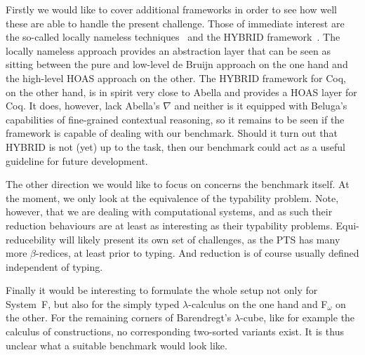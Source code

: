 \documentclass[a4paper,UKenglish]{lipics-v2016}
\begin{document}
Firstly we would like to cover additional frameworks in order to see how well these are able to handle the present challenge.
Those of immediate interest are the so-called locally nameless techniques~\cite{DBLP:conf/popl/AydemirCPPW08} and the HYBRID framework~\cite{Capretta2007, Capretta2009, DBLP:journals/jar/FeltyM12}.
The locally nameless approach provides an abstraction layer that can be seen as sitting between the pure and low-level de Bruijn approach on the one hand and the high-level HOAS approach on the other.
The HYBRID framework for Coq, on the other hand, is in spirit very close to Abella and provides a HOAS layer for Coq.
It does, however, lack Abella's $\nabla$ and neither is it equipped with Beluga's capabilities of fine-grained contextual reasoning, so it remains to be seen if the framework is capable of dealing with our benchmark.
Should it turn out that HYBRID is not (yet) up to the task, then our benchmark could act as a useful guideline for future development.

The other direction we would like to focus on concerns the benchmark itself.
At the moment, we only look at the equivalence of the typability problem.
Note, however, that we are dealing with computational systems, and as such their reduction behaviours are at least as interesting as their typability problems.
Equi-reducebility will likely present its own set of challenges, as the PTS has many more $\beta$-redices, at least prior to typing.
And reduction is of course usually defined independent of typing.

Finally it would be interesting to formulate the whole setup not only for System~F, but also for the simply typed $\lambda$-calculus on the one hand and F$_\omega$ on the other.
For the remaining corners of Barendregt's $\lambda$-cube, like for example the calculus of constructions, no corresponding two-sorted variants exist.
It is thus unclear what a suitable benchmark would look like.









 
\end{document}

